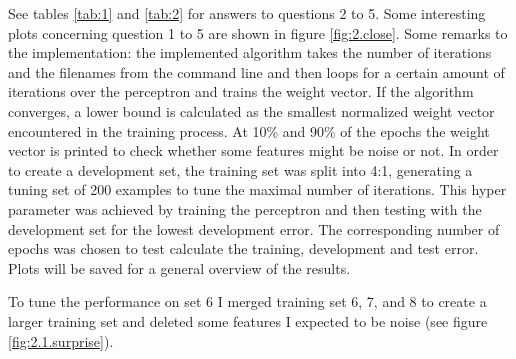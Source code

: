 \documentclass[12pt]{article}
\begin{document}
See tables \ref{tab:1} and \ref{tab:2} for answers to questions 2 to 5. Some interesting plots concerning question 1 to 5 are shown in figure \ref{fig:2.close}. 
Some remarks to the implementation: the implemented algorithm takes the number of iterations and the filenames from the command line and then loops for a certain amount of iterations over the perceptron and trains the weight vector. If the algorithm converges, a lower bound is calculated as the smallest normalized weight vector encountered in the training process. At 10\% and 90\% of the epochs the weight vector is printed to check whether some features might be noise or not. In order to create a development set, the training set was split into 4:1, generating a tuning set of 200 examples to tune the maximal number of iterations. This hyper parameter was achieved by training the perceptron and then testing with the development set for the lowest development error. The corresponding number of epochs was chosen to test calculate the training, development and test error. Plots will be saved for a general overview of the results. \par 
To tune the performance on set 6 I merged training set 6, 7, and 8 to create a larger training set and deleted some features I expected to be noise (see figure \ref{fig:2.1.surprise}).
\end{document}
